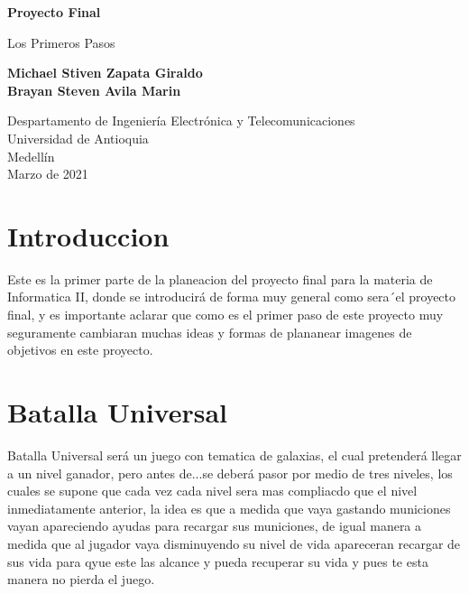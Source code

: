 \documentclass{article}
\begin{document}
\begin{titlepage}
    \begin{center}
        \vspace*{1cm}
            
        \Huge
        \textbf{Proyecto Final}
            
        \vspace{0.5cm}
        \LARGE
         Los Primeros Pasos
            
        \vspace{1.5cm}
            
        \textbf{Michael Stiven Zapata Giraldo \\ Brayan Steven Avila Marin}
            
        \vfill
            
        \vspace{0.8cm}
            
        \Large
        Despartamento de Ingeniería Electrónica y Telecomunicaciones\\
        Universidad de Antioquia\\
        Medellín\\
        Marzo de 2021
            
    \end{center}
\end{titlepage}

\tableofcontents
\newpage
\section{Introduccion}\label{intro}

Este es la primer parte de la planeacion del proyecto final para la materia de Informatica II, donde se introducirá de forma muy general como sera´el proyecto final, y es importante aclarar que como es el primer paso de este proyecto muy seguramente cambiaran muchas ideas y formas de plananear imagenes de objetivos en este proyecto.  

\section{Batalla Universal} \label{contenido}
Batalla Universal será un juego con tematica de galaxias, el cual pretenderá llegar a un nivel ganador, pero antes de...se deberá pasor por medio de tres niveles, los cuales se supone que cada vez cada nivel sera mas compliacdo que el nivel inmediatamente anterior, la idea es que a medida que vaya gastando municiones vayan apareciendo ayudas para recargar sus municiones, de igual manera a medida que al jugador vaya disminuyendo su nivel de vida apareceran recargar de sus vida para qyue este las alcance y pueda recuperar su vida y pues  te esta manera no pierda el juego. 
\end{document}

